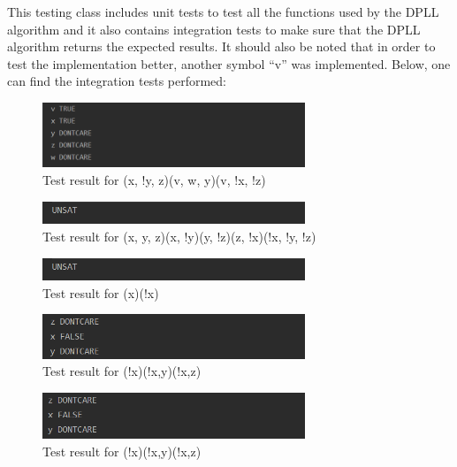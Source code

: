 \documentclass{article}
\newcommand{\quotes}[1]{``#1''}
\begin{document}
	This testing class includes unit tests to test all the functions used by the DPLL algorithm and it also contains integration tests to make sure that the DPLL algorithm returns the expected results. It should also be noted that in order to test the implementation better, another symbol \quotes{v} was implemented.
	Below, one can find the integration tests performed:
	
	
	\begin{figure}[H]
					\centering
			 			\includegraphics[width=0.7\textwidth]{dplltest1.png}
			 			\centering
			  			\caption{Test result for (x, !y, z)(v, w, y)(v, !x, !z)}
			  			\label{fig:dplltest1}
					\end{figure}
					
	
	\begin{figure}[H]
					\centering
			 			\includegraphics[width=0.7\textwidth]{dplltest2.png}
			 			\centering
			  			\caption{Test result for (x, y, z)(x, !y)(y, !z)(z, !x)(!x, !y, !z)}
			  			\label{fig:dplltest2}
					\end{figure}
		
		\begin{figure}[H]
					\centering
			 			\includegraphics[width=0.7\textwidth]{dplltest2.png}
			 			\centering
			  			\caption{Test result for (x)(!x)}
			  			\label{fig:dplltest2}
					\end{figure}
	

		\begin{figure}[H]
					\centering
			 			\includegraphics[width=0.7\textwidth]{dplltest4.png}
			 			\centering
			  			\caption{Test result for (!x)(!x,y)(!x,z)}
			  			\label{fig:dplltest4}
					\end{figure}		

			\begin{figure}[H]
					\centering
			 			\includegraphics[width=0.7\textwidth]{dplltest5.png}
			 			\centering
			  			\caption{Test result for (!x)(!x,y)(!x,z)}
			  			\label{fig:dplltest5}
					\end{figure}	
\end{document}
